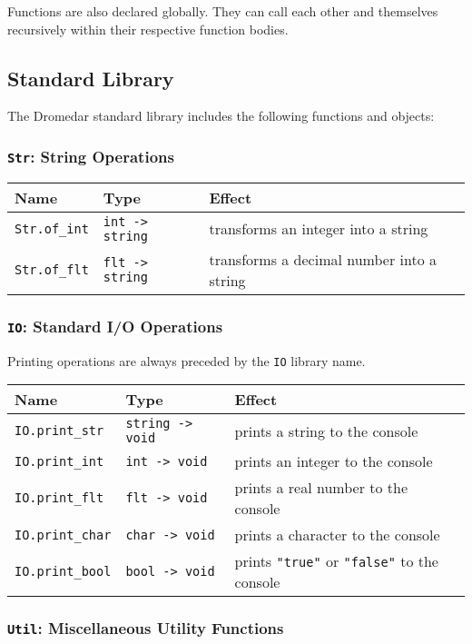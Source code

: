 \documentclass{article}
\newcommand{\code}[1]{\lstinline[columns=fixed]{#1}}
\begin{document}
			Functions are also declared globally. They can call each other and themselves recursively within their respective function bodies.
			
		\subsection{Standard Library}
		
			The Dromedar standard library includes the following functions and objects:
			
			\subsubsection{\code{Str}: String Operations}
			
				\begin{longtable}{l|l|l}
					\textbf{Name} & \textbf{Type} & \textbf{Effect} \\
					\midrule
					\code{Str.of_int} & \code{int -> string} & transforms an integer into a string \\
					\code{Str.of_flt} & \code{flt -> string} & transforms a decimal number into a string
				\end{longtable}
			
			\subsubsection{\code{IO}: Standard I/O Operations}
			
				Printing operations are always preceded by the \code{IO} library name.
			
				\begin{longtable}{l|l|l}
					\textbf{Name} & \textbf{Type} & \textbf{Effect} \\
					\midrule
					\code{IO.print_str} & \code{string -> void} & prints a string to the console\\
					\code{IO.print_int} & \code{int -> void} & prints an integer to the console\\
					\code{IO.print_flt} & \code{flt -> void} & prints a real number to the console\\
					\code{IO.print_char} & \code{char -> void} & prints a character to the console\\
					\code{IO.print_bool} & \code{bool -> void} & prints \code{"true"} or \code{"false"} to the console
				\end{longtable}
			
			\subsubsection{\code{Util}: Miscellaneous Utility Functions}
			
\end{document}
